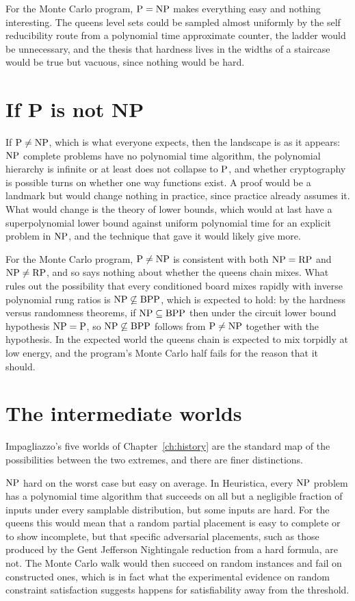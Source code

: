 For the Monte Carlo program, $\mathrm{P} = \mathrm{NP}$ makes everything easy and nothing interesting. The queens level sets could be sampled almost uniformly by the self reducibility route from a polynomial time approximate counter, the ladder would be unnecessary, and the thesis that hardness lives in the widths of a staircase would be true but vacuous, since nothing would be hard.

\section{If P is not NP}

If $\mathrm{P} \neq \mathrm{NP}$, which is what everyone expects, then the landscape is as it appears: $\mathrm{NP}$ complete problems have no polynomial time algorithm, the polynomial hierarchy is infinite or at least does not collapse to $\mathrm{P}$, and whether cryptography is possible turns on whether one way functions exist. A proof would be a landmark but would change nothing in practice, since practice already assumes it. What would change is the theory of lower bounds, which would at last have a superpolynomial lower bound against uniform polynomial time for an explicit problem in $\mathrm{NP}$, and the technique that gave it would likely give more.

For the Monte Carlo program, $\mathrm{P} \neq \mathrm{NP}$ is consistent with both $\mathrm{NP} = \mathrm{RP}$ and $\mathrm{NP} \neq \mathrm{RP}$, and so says nothing about whether the queens chain mixes. What rules out the possibility that every conditioned board mixes rapidly with inverse polynomial rung ratios is $\mathrm{NP} \not\subseteq \mathrm{BPP}$, which is expected to hold: by the hardness versus randomness theorems, if $\mathrm{NP} \subseteq \mathrm{BPP}$ then under the circuit lower bound hypothesis $\mathrm{NP} = \mathrm{P}$, so $\mathrm{NP} \not\subseteq \mathrm{BPP}$ follows from $\mathrm{P} \neq \mathrm{NP}$ together with the hypothesis. In the expected world the queens chain is expected to mix torpidly at low energy, and the program's Monte Carlo half fails for the reason that it should.

\section{The intermediate worlds}

Impagliazzo's five worlds of Chapter~\ref{ch:history} are the standard map of the possibilities between the two extremes, and there are finer distinctions.

$\mathrm{NP}$ hard on the worst case but easy on average. In Heuristica, every $\mathrm{NP}$ problem has a polynomial time algorithm that succeeds on all but a negligible fraction of inputs under every samplable distribution, but some inputs are hard. For the queens this would mean that a random partial placement is easy to complete or to show incomplete, but that specific adversarial placements, such as those produced by the Gent Jefferson Nightingale reduction from a hard formula, are not. The Monte Carlo walk would then succeed on random instances and fail on constructed ones, which is in fact what the experimental evidence on random constraint satisfaction suggests happens for satisfiability away from the threshold.

